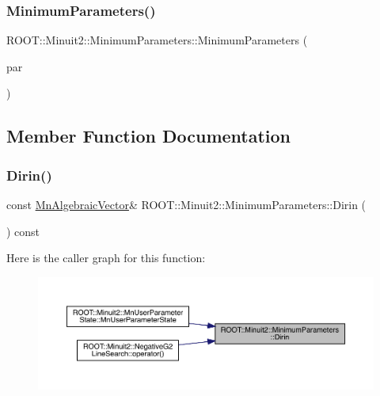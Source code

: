 \subsubsection{\texorpdfstring{MinimumParameters()}{MinimumParameters()}\hspace{0.1cm}{\footnotesize\ttfamily [12/12]}}
{\footnotesize\ttfamily R\+O\+O\+T\+::\+Minuit2\+::\+Minimum\+Parameters\+::\+Minimum\+Parameters (\begin{DoxyParamCaption}\item[{const \mbox{\hyperlink{classROOT_1_1Minuit2_1_1MinimumParameters}{Minimum\+Parameters}} \&}]{par }\end{DoxyParamCaption})\hspace{0.3cm}{\ttfamily [inline]}}



\subsection{Member Function Documentation}
\mbox{\label{classROOT_1_1Minuit2_1_1MinimumParameters_a2c5c5f0add9ecbdf6b5d4ff962d68d15}} 
\subsubsection{\texorpdfstring{Dirin()}{Dirin()}\hspace{0.1cm}{\footnotesize\ttfamily [1/3]}}
{\footnotesize\ttfamily const \mbox{\hyperlink{namespaceROOT_1_1Minuit2_a62ed97730a1ca8d3fbaec64a19aa11c9}{Mn\+Algebraic\+Vector}}\& R\+O\+O\+T\+::\+Minuit2\+::\+Minimum\+Parameters\+::\+Dirin (\begin{DoxyParamCaption}{ }\end{DoxyParamCaption}) const\hspace{0.3cm}{\ttfamily [inline]}}

Here is the caller graph for this function\+:
\nopagebreak
\begin{figure}[H]
\begin{center}
\leavevmode
\includegraphics[width=350pt]{db/db8/classROOT_1_1Minuit2_1_1MinimumParameters_a2c5c5f0add9ecbdf6b5d4ff962d68d15_icgraph}
\end{center}
\end{figure}
\mbox{\label{classROOT_1_1Minuit2_1_1MinimumParameters_a2c5c5f0add9ecbdf6b5d4ff962d68d15}} 
